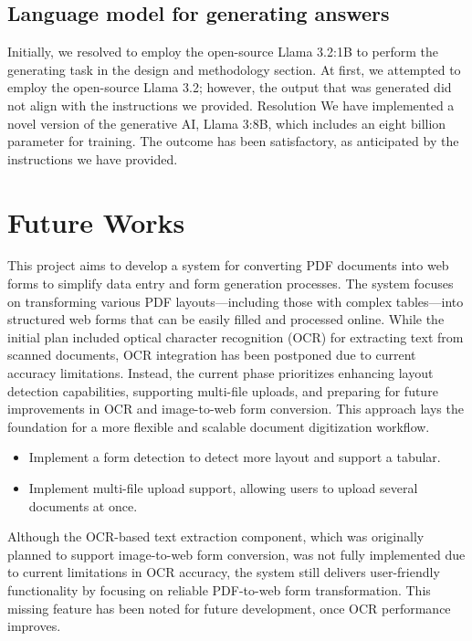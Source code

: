 \documentclass[12pt,oneside,openright,a4paper]{cpe-english-project}
\begin{document}
\subsection{Language model for generating answers}

Initially, we resolved to employ the open-source Llama 3.2:1B to perform the generating task in the design and methodology section. At first, we attempted to employ the open-source Llama 3.2; however, the output that was generated did not align with the instructions we provided. Resolution We have implemented a novel version of the generative AI, Llama 3:8B, which includes an eight billion parameter for training. The outcome has been satisfactory, as anticipated by the instructions we have provided.

\section{Future Works}

This project aims to develop a system for converting PDF documents into web forms to simplify data entry and form generation processes. The system focuses on transforming various PDF layouts—including those with complex tables—into structured web forms that can be easily filled and processed online. While the initial plan included optical character recognition (OCR) for extracting text from scanned documents, OCR integration has been postponed due to current accuracy limitations. Instead, the current phase prioritizes enhancing layout detection capabilities, supporting multi-file uploads, and preparing for future improvements in OCR and image-to-web form conversion. This approach lays the foundation for a more flexible and scalable document digitization workflow.

\begin{itemize}  
  \item Implement a form detection to detect more layout and support a tabular.
  
  \item Implement multi-file upload support, allowing users to upload several documents at once.
\end{itemize}

Although the OCR-based text extraction component, which was originally planned to support image-to-web form conversion, was not fully implemented due to current limitations in OCR accuracy, the system still delivers user-friendly functionality by focusing on reliable PDF-to-web form transformation. This missing feature has been noted for future development, once OCR performance improves.
\end{document}
